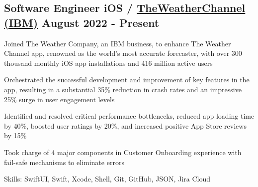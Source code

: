 \subsection{{Software Engineer iOS / \href{https://weather.com/}{TheWeatherChannel (IBM)} \hfill August 2022 - Present}}
\begin{zitemize}
\setlength\itemsep{0.5em}

\item Joined The Weather Company, an IBM business, to enhance The Weather Channel app, renowned as the world's most accurate forecaster, with over 300 thousand monthly iOS app installations and 416 million active users 

\item Orchestrated the successful development and improvement of key features in the app, resulting in a substantial 35\% reduction in crash rates and an impressive 25\% surge in user engagement levels

\item Identified and resolved critical performance bottlenecks, reduced app loading time by 40\%, boosted user ratings by 20\%, and increased positive App Store reviews by 15\%

\item Took charge of 4 major components in Customer Onboarding experience with fail-safe mechanisms to eliminate errors

\item[] Skills: SwiftUI, Swift, Xcode, Shell, Git, GitHub, JSON, Jira Cloud
\end{zitemize}
